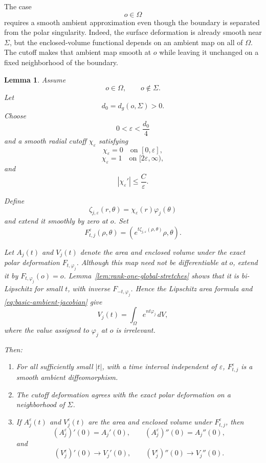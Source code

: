 \documentclass[11pt,reqno]{amsart}
\numberwithin{equation}{section}
\newtheorem{lemma}[theorem]{Lemma}
\theoremstyle{definition}
\theoremstyle{remark}
\newcommand{\eps}{\varepsilon}
\newcommand{\distg}{d_g}
\begin{document}
The case
\[
o\in\Omega
\]
requires a smooth ambient approximation even though the boundary is separated
from the polar singularity.  Indeed, the surface deformation is already
smooth near $\Sigma$, but the enclosed-volume functional depends on an
ambient map on all of $\Omega$.  The cutoff makes that ambient map smooth at
$o$ while leaving it unchanged on a fixed neighborhood of the boundary.

\begin{lemma}
\label{lem:interior-cutoff}
Assume
\[
o\in\Omega,
\qquad
o\notin\Sigma.
\]
Let
\[
d_0=\distg(o,\Sigma)>0.
\]
Choose
\[
0<\eps<\frac{d_0}{4}
\]
and a smooth radial cutoff \(\chi_\eps\) satisfying
\[
\chi_\eps=0
\quad\text{on }[0,\eps],
\]
\[
\chi_\eps=1
\quad\text{on }[2\eps,\infty),
\]
and
\[
|\chi_\eps'|\le\frac{C}{\eps}.
\]

Define
\[
\zeta_{j,\eps}(r,\theta)
=
\chi_\eps(r)\varphi_j(\theta)
\]
and extend it smoothly by zero at \(o\). Set
\[
F^\eps_{t,j}(\rho,\theta)
=
\left(
e^{t\zeta_{j,\eps}(\rho,\theta)}\rho,
\theta
\right).
\]

Let \(A_j(t)\) and \(V_j(t)\) denote the area and enclosed volume under the
exact polar deformation \(F_{t,\varphi_j}\).
Although this map need not be differentiable at \(o\), extend it by
\(F_{t,\varphi_j}(o)=o\).  Lemma~\ref{lem:rank-one-global-stretches}
shows that it is bi-Lipschitz for small \(t\), with inverse
\(F_{-t,\varphi_j}\).  Hence the Lipschitz area formula and
\eqref{eq:basic-ambient-jacobian} give
\[
V_j(t)
=
\int_\Omega e^{nt\varphi_j}\,dV,
\]
where the value assigned to \(\varphi_j\) at \(o\) is irrelevant.

Then:

\begin{enumerate}[label=\textup{(\roman*)}]

\item
For all sufficiently small \(|t|\), with a time interval independent of
\(\eps\), \(F^\eps_{t,j}\) is a smooth ambient diffeomorphism.

\item
The cutoff deformation agrees with the exact polar deformation on a
neighborhood of \(\Sigma\).

\item
If \(A^\eps_j(t)\) and \(V^\eps_j(t)\) are the area and enclosed volume
under \(F^\eps_{t,j}\), then
\begin{equation}
(A^\eps_j)'(0)=A_j'(0),
\qquad
(A^\eps_j)''(0)=A_j''(0),
\label{eq:interior-area-equality}
\end{equation}
and
\begin{equation}
(V^\eps_j)'(0)\to V_j'(0),
\qquad
(V^\eps_j)''(0)\to V_j''(0).
\label{eq:interior-volume-convergence}
\end{equation}


\end{enumerate}
\end{lemma}
\end{document}
